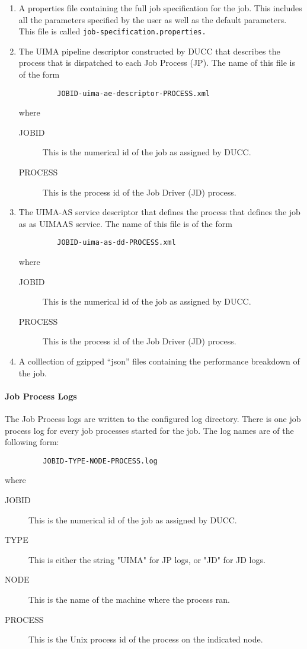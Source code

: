 \begin{enumerate}
    \item A properties file containing the full job specification for the job. This includes all the 
      parameters specified by the user as well as the default parameters. This file is called
      {\tt job-specification.properties.}
    \item The UIMA pipeline descriptor constructed by DUCC that describes the process that is 
      dispatched to each Job Process (JP). The name of this file is of the form 
\begin{verbatim}
         JOBID-uima-ae-descriptor-PROCESS.xml 
\end{verbatim}
      where 
      \begin{description}
          \item[JOBID] This is the numerical id of the job as assigned by DUCC.
          \item[PROCESS] This is the process id of the Job Driver (JD) process.
      \end{description}      

    \item The UIMA-AS service descriptor that defines the process that defines the job as as UIMAAS 
      service. The name of this file is of the form 
\begin{verbatim}
         JOBID-uima-as-dd-PROCESS.xml 
\end{verbatim}
      
      where 
      \begin{description}
         \item[JOBID] This is the numerical id of the job as assigned by DUCC.
         \item[PROCESS] This is the process id of the Job Driver (JD) process.
      \end{description}
      
    \item A colllection of gzipped ``json'' files containing the performance breakdown of the job.

\end{enumerate}

\paragraph{Job Process Logs}
The Job Process logs are written to the configured log directory.  There is one job process log
for every job processes started for the job.  The log names are of the following form:
\begin{verbatim}
         JOBID-TYPE-NODE-PROCESS.log 
\end{verbatim}
where 
\begin{description}
\item[JOBID] This is the numerical id of the job as assigned by DUCC.
\item[TYPE] This is either the string "UIMA" for JP logs, or "JD" for JD logs.
\item[NODE] This is the name of the machine where the process ran.
\item[PROCESS] This is the Unix process id of the process on the indicated node.
\end{description}

